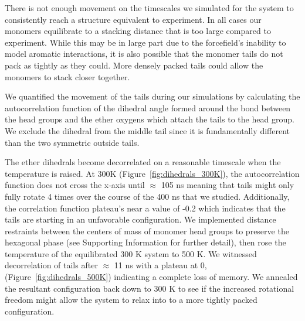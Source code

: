 \documentclass[journal=jpcbfk,manusciprt=article]{achemso}
\begin{document}

  There is not enough movement on the timescales we simulated for the system to 
  consistently reach a structure equivalent to experiment. In all cases our monomers
  equilibrate to a stacking distance that is too large compared to experiment. 
  While this may be in large part due to the forcefield's inability to model aromatic
  interactions, it is also possible that the monomer tails do not pack as tightly as 
  they could. More densely packed tails could allow the monomers to stack closer 
  together. 
  
  We quantified the movement of the tails during our simulations by calculating the 
  autocorrelation function of the dihedral angle formed around the bond between the 
  head groups and the ether oxygens which attach the tails to the head group. 
  We exclude the dihedral from the middle tail since it is fundamentally different
  than the two symmetric outside tails. 
  
  The ether dihedrals become decorrelated on a reasonable timescale when the temperature
  is raised. At 300K (Figure~\ref{fig:dihedrals_300K}), the autocorrelation function does
  not cross the x-axis until $\approx$ 105 ns meaning that tails might only fully rotate
  4 times over the course of the 400 ns that we studied. Additionally, the correlation 
  function plateau's near a value of -0.2 which indicates that the tails are starting in 
  an unfavorable configuration. We implemented distance restraints between the centers of 
  mass of monomer head groups to preserve the hexagonal phase (see Supporting Information
  for further detail), then rose the temperature of the equilibrated 300 K system to 500 K.
  We witnessed decorrelation of tails after $\approx$ 11 ns with a plateau at 0, 
  (Figure~\ref{fig:dihedrals_500K}) indicating a complete loss of memory. We annealed the 
  resultant configuration back down to 300 K to see if the increased rotational freedom 
  might allow the system to relax into to a more tightly packed configuration.
  
\end{document}
